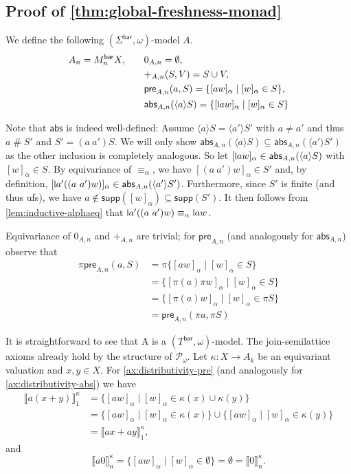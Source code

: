 \documentclass[a4paper,UKenglish,cleveref,thm-restate,numberwithinsect,final]{lipics-v2021}
\newcommand{\Br}{\mathsf{bar}}
\newcommand{\pre}{\mathsf{pre}}
\newcommand{\abs}{\mathsf{abs}}
\newcommand{\alphaeq}{\equiv_\alpha}
\newcommand{\pow}{\mathcal{P}}
\newcommand{\fresh}{\mathbin{\#}}
\newcommand{\supp}{\mathsf{supp}}
\newcommand{\bind}[1]{\langle #1\rangle}
\theoremstyle{plain}
\newcommand{\midmid}{\hspace{0.2ex}{\rule[-0.1ex]{0.6pt}{1.65ex}}\hspace{0.2ex}}
\newcommand{\newletter}[1]{{\midmid}#1}
\numberwithin{equation}{section}
\newcommand{\sem}[1]{\llbracket #1 \rrbracket}
\newcommand{\+}[1]{\mathcal{#1}\xspace}
\theoremstyle{definition}
\begin{document}
\subsection*{Proof of \cref{thm:global-freshness-monad}}

We define the following $(\Sigma^\Br, \omega)$-model $A$.
\begin{align*}
A_n = M^\Br_n X, \qquad & 0_{A,n} = \emptyset, \\
& {+}_{A,n}(S, V) = S \cup V, \\
& \pre_{A,n}(a,S)=\{[aw]_\alpha\mid [w]_\alpha\in S\}, \\
& \abs_{A,n}(\bind{a}S)=\{[\newletter aw]_\alpha\mid[w]_\alpha\in S\}
\end{align*}

Note that \(\abs\) is indeed well-defined:
Assume \(\bind{a}S = \bind{a'}S'\) with \(a \neq a'\) and thus \(a \fresh S'\) and \(S' = (a\ a')S\).
We will only show \(\abs_{A, n}(\bind{a}S) \subseteq \abs_{A, n}(\bind{a'}S')\) as the other inclusion is completely analogous.
So let \([\newletter{a}w]_\alpha \in \abs_{A, n}(\bind{a}S)\) with \([w]_\alpha \in S\).
By equivariance of \(\alphaeq\), we have \([(a\ a')w]_\alpha \in S'\) and, by definition, \([\newletter{a'}((a\ a')w)]_\alpha \in \abs_{A, n}(\bind{a'}S')\).
Furthermore, since \(S'\) is finite (and thus ufs), we have \(a \notin \supp([w]_\alpha) \subseteq \supp(S')\).
It then follows from \cref{lem:inductive-alphaeq} that \(\newletter{a'}((a\ a')w) \alphaeq \newletter{a}w\).

Equivariance of $0_{A,n}$ and $+_{A,n}$ are trivial; for $\pre_{A,n}$ (and analogously for $\abs_{A,n}$) observe that
\begin{align*}
    \pi \pre_{A,n}(a,S) &= \pi \{[aw]_\alpha\mid [w]_\alpha\in S\} \\
    &= \{[\pi(a)\pi w]_\alpha\mid [w]_\alpha\in S\} \\
    &= \{[\pi(a) w]_\alpha\mid [w]_\alpha\in \pi S\} \\
    &= \pre_{A,n}(\pi a, \pi S)
\end{align*}

It is straightforward to see that A is a $(T^\Br,\omega)$-model. The join-semilattice axioms already hold by the structure of \(\pow_\omega\). Let \(\kappa: X \to A_k\) be an equivariant valuation and $x,y \in X$. For \eqref{ax:distributivity-pre} (and analogously for \eqref{ax:distributivity-abs}) we have
    \begin{align*}
      \sem{a(x + y)}^\kappa_1
      &= \{ [aw]_\alpha \mid [w]_\alpha \in \kappa(x) \cup \kappa(y) \} \\
      &= \{ [aw]_\alpha \mid [w]_\alpha \in \kappa(x) \} \cup \{ [aw]_\alpha \mid [w]_\alpha \in \kappa(y) \} \\
      &= \sem{ax + ay}^\kappa_1,
    \end{align*}
    and
    \begin{equation*}
      \sem{a 0}^\kappa_n = \{ [aw]_\alpha \mid [w]_\alpha \in \emptyset \} = \emptyset = \sem{0}^\kappa_n.
    \end{equation*}
\end{document}
